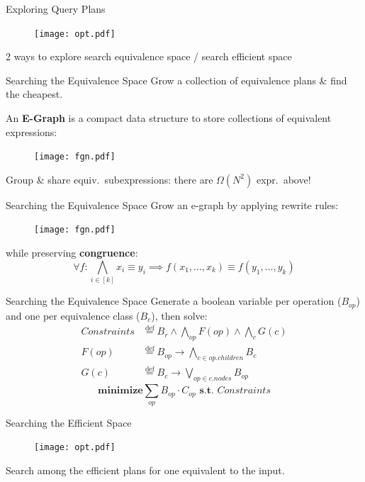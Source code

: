 \documentclass{beamer}
\newcommand{\deq}{\stackrel{\text{def}}{=}}
\begin{document}
  \begin{frame}{Exploring Query Plans}
    \begin{figure}
      \texttt{[image: opt.pdf]}
    \end{figure}
    2 ways to explore search equivalence space / search efficient space
  \end{frame}

  \begin{frame}{Searching the Equivalence Space}
    Grow a collection of equivalence plans \& find the cheapest. \pause

    An \textbf{E-Graph} is a compact data structure to store collections 
    of equivalent expressions:
    \begin{figure}
      \texttt{[image: fgn.pdf]}
    \end{figure}
    Group \& share equiv.~subexpressions: there are $\Omega(N^2)$ expr.~above!
  \end{frame}

  \begin{frame}{Searching the Equivalence Space}
    Grow an e-graph by applying rewrite rules:
    \begin{figure}
      \texttt{[image: fgn.pdf]}
    \end{figure}
    while preserving \textbf{congruence}: 
    \[\forall f : \bigwedge_{i \in [k]} x_i \equiv y_i \implies f(x_1, \ldots, x_k ) \equiv f(y_1, \ldots, y_k)\]
  \end{frame}

  \begin{frame}{Searching the Equivalence Space}
    Generate a boolean variable per operation ($B_{op}$) and 
    one per equivalence class ($B_{c}$), then solve:
    \begin{align*}
      Constraints &\deq B_r \wedge \bigwedge_{op} F(op) \wedge \bigwedge_c G(c)
      \\ F(op) &\deq B_{op} \rightarrow \bigwedge_{c \in op.children} B_c \\ G(c)
      &\deq B_c \rightarrow \bigvee_{op \in c.nodes} B_{op}
      \end{align*}
      \[\textbf{minimize} \sum_{op} B_{op} \cdot C_{op} \textbf{ s.t. } Constraints\]
  \end{frame}

  \begin{frame}{Searching the Efficient Space}
    \begin{figure}
      \texttt{[image: opt.pdf]}
    \end{figure}
    Search among the efficient plans for one equivalent to the input.
  \end{frame}
\end{document}
